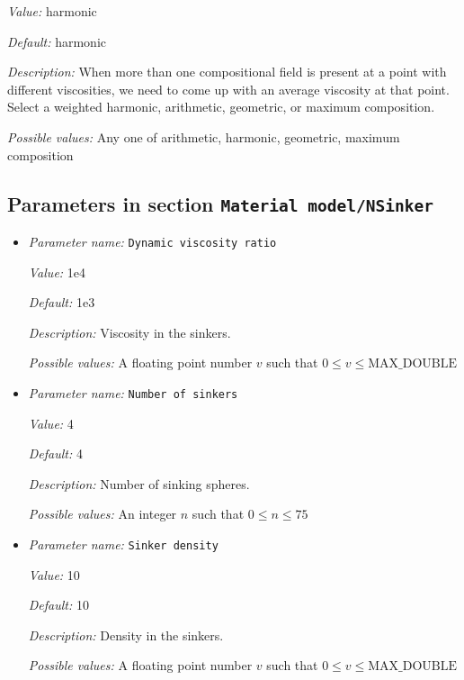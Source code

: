 \begin{itemize}
{\it Value:} harmonic


{\it Default:} harmonic


{\it Description:} When more than one compositional field is present at a point with different viscosities, we need to come up with an average viscosity at that point.  Select a weighted harmonic, arithmetic, geometric, or maximum composition.


{\it Possible values:} Any one of arithmetic, harmonic, geometric, maximum composition
\end{itemize}

\subsection{Parameters in section \tt Material model/NSinker}
\label{parameters:Material_20model/NSinker}

\begin{itemize}
\item {\it Parameter name:} {\tt Dynamic viscosity ratio}
\label{parameters:Material model/NSinker/Dynamic viscosity ratio}
\label{parameters:Material_20model/NSinker/Dynamic_20viscosity_20ratio}


{\it Value:} 1e4


{\it Default:} 1e3


{\it Description:} Viscosity in the sinkers.


{\it Possible values:} A floating point number $v$ such that $0 \leq v \leq \text{MAX\_DOUBLE}$
\item {\it Parameter name:} {\tt Number of sinkers}
\label{parameters:Material model/NSinker/Number of sinkers}
\label{parameters:Material_20model/NSinker/Number_20of_20sinkers}


{\it Value:} 4


{\it Default:} 4


{\it Description:} Number of sinking spheres.


{\it Possible values:} An integer $n$ such that $0\leq n \leq 75$
\item {\it Parameter name:} {\tt Sinker density}
\label{parameters:Material model/NSinker/Sinker density}
\label{parameters:Material_20model/NSinker/Sinker_20density}


{\it Value:} 10


{\it Default:} 10


{\it Description:} Density in the sinkers.


{\it Possible values:} A floating point number $v$ such that $0 \leq v \leq \text{MAX\_DOUBLE}$
\end{itemize}

